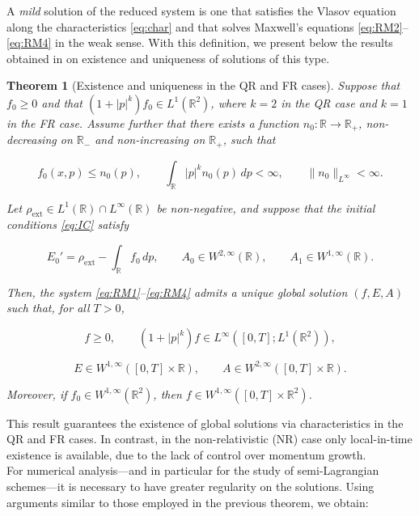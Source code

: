 \documentclass[11pt,a4paper,twoside,pdf]{article}
\numberwithin{equation}{section}
\newtheorem{theorem}{Theorem}[section]
\begin{document}
A \emph{mild} solution of the reduced system is one that satisfies the Vlasov equation along the characteristics \eqref{eq:char} and that solves Maxwell's equations \eqref{eq:RM2}--\eqref{eq:RM4} in the weak sense. With this definition, we present below the results obtained in \cite{bostan2007mild} on existence and uniqueness of solutions of this type.



\begin{theorem}[Existence and uniqueness in the QR and FR cases]
Suppose that $f_0\ge 0$ and that $(1+|p|^k)f_0\in L^1(\mathbb{R}^2)$, where $k=2$ in the QR case and $k=1$ in the FR case. Assume further that there exists a function $n_0:\mathbb{R}\to\mathbb{R}_+$, non-decreasing on $\mathbb{R}_-$ and non-increasing on $\mathbb{R}_+$, such that


\[
f_0(x,p)\le n_0(p), \qquad
\int_{\mathbb{R}} |p|^k n_0(p)\,dp <\infty, \qquad
\|n_0\|_{L^\infty}<\infty.
\]



Let $\rho_{\mathrm{ext}}\in L^1(\mathbb{R})\cap L^\infty(\mathbb{R})$ be non-negative, and suppose that the initial conditions \eqref{eq:IC} satisfy


\[
E_0' = \rho_{\mathrm{ext}} - \int_{\mathbb{R}} f_0\,dp, \qquad
A_0\in W^{2,\infty}(\mathbb{R}), \qquad
A_1\in W^{1,\infty}(\mathbb{R}).
\]



Then, the system \eqref{eq:RM1}--\eqref{eq:RM4} admits a unique global solution $(f,E,A)$ such that, for all $T>0$,


\[
f\ge 0, \qquad
(1+|p|^k)f \in L^\infty([0,T];L^1(\mathbb{R}^2)),
\]




\[
E\in W^{1,\infty}([0,T]\times\mathbb{R}), \qquad
A\in W^{2,\infty}([0,T]\times\mathbb{R}).
\]


Moreover, if $f_0\in W^{1,\infty}(\mathbb{R}^2)$, then $f\in W^{1,\infty}([0,T]\times\mathbb{R}^2)$.
\end{theorem}

This result guarantees the existence of global solutions via characteristics in the QR and FR cases. In contrast, in the non-relativistic (NR) case only local-in-time existence is available, due to the lack of control over momentum growth.\\

For numerical analysis—and in particular for the study of semi-Lagrangian schemes—it is necessary to have greater regularity on the solutions. Using arguments similar to those employed in the previous theorem, we obtain:
\end{document}
